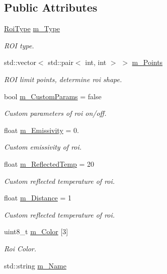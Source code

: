 \subsection*{Public Attributes}
\begin{DoxyCompactItemize}
\item 
\hyperlink{namespacewtl_aeaf0390c682c56122c5c9c43b5c2cc65}{Roi\+Type} \hyperlink{structwtl_1_1_roi_struct_a6561baf676e8ff9916e4e7896357cdd2}{m\+\_\+\+Type}
\begin{DoxyCompactList}\small\item\em R\+OI type. \end{DoxyCompactList}\item 
std\+::vector$<$ std\+::pair$<$ int, int $>$ $>$ \hyperlink{structwtl_1_1_roi_struct_a00028c74918a3b106de8593c9711d6bb}{m\+\_\+\+Points}
\begin{DoxyCompactList}\small\item\em R\+OI limit points, determine roi shape. \end{DoxyCompactList}\item 
bool \hyperlink{structwtl_1_1_roi_struct_adafeda8cccd3c750b680a4f97e7622b0}{m\+\_\+\+Custom\+Params} = false
\begin{DoxyCompactList}\small\item\em Custom parameters of roi on/off. \end{DoxyCompactList}\item 
float \hyperlink{structwtl_1_1_roi_struct_a904a554648c53dec3c9957da150fd7fc}{m\+\_\+\+Emissivity} = 0.
\begin{DoxyCompactList}\small\item\em Custom emissivity of roi. \end{DoxyCompactList}\item 
float \hyperlink{structwtl_1_1_roi_struct_abed08b2a02526d47c9fc5648552bae2c}{m\+\_\+\+Reflected\+Temp} = 20
\begin{DoxyCompactList}\small\item\em Custom reflected temperature of roi. \end{DoxyCompactList}\item 
float \hyperlink{structwtl_1_1_roi_struct_aa54a5dfca793c3122ee7ff4e273d9441}{m\+\_\+\+Distance} = 1
\begin{DoxyCompactList}\small\item\em Custom reflected temperature of roi. \end{DoxyCompactList}\item 
uint8\+\_\+t \hyperlink{structwtl_1_1_roi_struct_adacf81e095c9231ebf28aa7866b96234}{m\+\_\+\+Color} \mbox{[}3\mbox{]}
\begin{DoxyCompactList}\small\item\em Roi Color. \end{DoxyCompactList}\item 
std\+::string \hyperlink{structwtl_1_1_roi_struct_aa7fb8bc9f8f220281a3e3425edd6fd8f}{m\+\_\+\+Name}
\end{DoxyCompactItemize}


